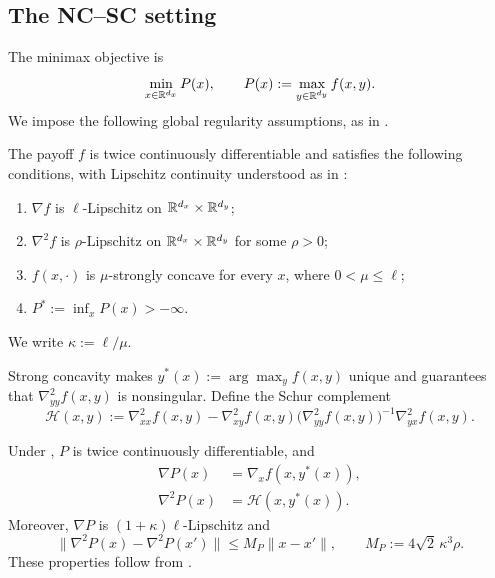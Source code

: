 \documentclass{article}
\begin{document}
\subsection{The NC--SC setting}
\label{sec:ncsc}

The minimax objective is
\begin{equation}\label{eq:ncsc-problem}
 \min_{x\in\mathbb{R}^{d_x}}P(x),\qquad
 P(x):=\max_{y\in\mathbb{R}^{d_y}}f(x,y).
\end{equation}
We impose the following global regularity assumptions, as in
\citet{luo2022finding}.

\begin{assumption}[NC--SC regularity]\label{ass:ncsc}
The payoff $f$ is twice continuously differentiable and satisfies
the following conditions, with Lipschitz continuity understood as in
:
\begin{enumerate}[label=(\roman*)]
  \item $\nabla f$ is $\ell$-Lipschitz on
  $\mathbb{R}^{d_x}\times\mathbb{R}^{d_y}$;
  \item $\nabla^2f$ is $\rho$-Lipschitz on
  $\mathbb{R}^{d_x}\times\mathbb{R}^{d_y}$ for some $\rho>0$;
  \item $f(x,\cdot)$ is $\mu$-strongly concave for every $x$, where
  $0<\mu\le\ell$;
  \item $P^*:=\inf_xP(x)>-\infty$.
\end{enumerate}
\end{assumption}
We write $\kappa:=\ell/\mu$.

Strong concavity makes
$y^*(x):=\arg\max_y f(x,y)$ unique and guarantees that
$\nabla^2_{yy}f(x,y)$ is nonsingular.  Define the Schur complement
\begin{equation}\label{eq:schur-definition}
 \mathcal H(x,y):=\nabla^2_{xx}f(x,y)
 -\nabla^2_{xy}f(x,y)
  \bigl(\nabla^2_{yy}f(x,y)\bigr)^{-1}
  \nabla^2_{yx}f(x,y).
\end{equation}

\begin{lemma}\label{lem:value-geometry}
Under , $P$ is twice continuously differentiable, and
\begin{subequations}\label{eq:value-derivatives}
\begin{align}
 \nabla P(x)&=\nabla_xf(x,y^*(x)),\label{eq:value-gradient}\\
 \nabla^2P(x)&=\mathcal H(x,y^*(x)).\label{eq:value-hessian}
\end{align}
\end{subequations}
Moreover, $\nabla P$ is $(1+\kappa)\ell$-Lipschitz and
\begin{equation}\label{eq:value-hessian-lipschitz}
 \|\nabla^2P(x)-\nabla^2P(x')\|
 \le M_P\|x-x'\|,
 \qquad
 M_P:=4\sqrt2\,\kappa^3\rho.
\end{equation}
These properties follow from
\citet[Lemmas~1--3]{luo2022finding}.
\end{lemma}
\end{document}
